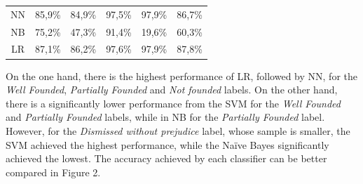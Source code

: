 \begin{table}[htb]
\begin{tabular}{crrrrr}
NN                 & 85,9\%                                                                              & 84,9\%                                                                                & 97,5\%                                                                             & 97,9\%                                                                                               & 86,7\%                                                                                \\\hdashline
NB                 & 75,2\%                                                                              & 47,3\%                                                                                & 91,4\%                                                                             & 19,6\%                                                                                               & 60,3\%                                                                                \\\hdashline
LR                 & 87,1\%                                                                              & 86,2\%                                                                                & 97,6\%                                                                             & 97,9\%                                                                                               & 87,8\%                                                                                \\ \hline
\end{tabular}

\end{table}

On the one hand, there is the highest performance of LR, followed by NN, for the \emph{Well Founded}, \emph{Partially Founded} and \emph{Not founded} labels. On the other hand, there is a significantly lower performance from the SVM for the \emph{Well Founded} and \emph{Partially Founded} labels, while in NB for the \emph{Partially Founded} label. However, for the \emph{Dismissed without prejudice} label, whose sample is smaller, the SVM achieved the highest performance, while the Naïve Bayes significantly achieved the lowest. The accuracy achieved by each classifier can be better compared in Figure 2. 

